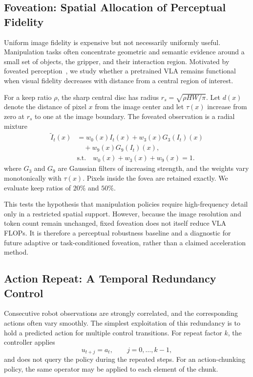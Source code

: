 \subsection{Foveation: Spatial Allocation of Perceptual Fidelity}
\label{sec:method_foveation}

Uniform image fidelity is expensive but not necessarily uniformly useful.
Manipulation tasks often concentrate geometric and semantic evidence around a
small set of objects, the gripper, and their interaction region. Motivated by
foveated perception~\cite{schwartz,traver}, we study whether a pretrained VLA
remains functional when visual fidelity decreases with distance from a central
region of interest.

For a keep ratio $\rho$, the sharp central disc has radius
$r_s=\sqrt{\rho HW/\pi}$. Let $d(x)$ denote the distance of pixel $x$ from the
image center and let $\tau(x)$ increase from zero at $r_s$ to one at the image
boundary. The foveated observation is a radial mixture
\begin{equation}
\begin{aligned}
\widetilde I_t(x)
&= w_0(x)I_t(x) + w_3(x)G_3(I_t)(x) \\
&\quad + w_9(x)G_9(I_t)(x), \\
&\text{s.t.}\quad
w_0(x)+w_3(x)+w_9(x)=1.
\end{aligned}
\label{eq:foveation}
\end{equation}
where $G_3$ and $G_9$ are Gaussian filters of increasing strength, and the
weights vary monotonically with $\tau(x)$. Pixels inside the fovea are retained
exactly. We evaluate keep ratios of $20\%$ and $50\%$.


This tests the hypothesis that manipulation policies require high-frequency detail
only in a restricted spatial support. However, because the image resolution
and token count remain unchanged, fixed foveation does not itself reduce VLA
FLOPs. It is therefore a perceptual robustness baseline and a diagnostic for
future adaptive or task-conditioned foveation, rather than a claimed
acceleration method.

\subsection{Action Repeat: A Temporal Redundancy Control}
\label{sec:method_action_repeat}

Consecutive robot observations are strongly correlated, and the corresponding
actions often vary smoothly. The simplest exploitation of this redundancy is
to hold a predicted action for multiple control transitions. For repeat factor
$k$, the controller applies
\begin{equation}
    u_{t+j}=a_t,\qquad j=0,\ldots,k-1,
    \label{eq:action_repeat}
\end{equation}
and does not query the policy during the repeated steps. For an action-chunking
policy, the same operator may be applied to each element of the chunk.

